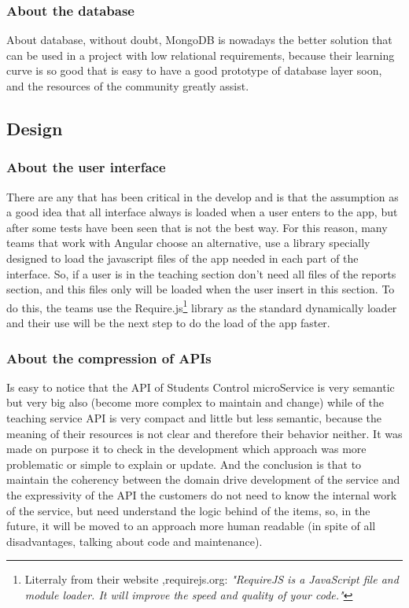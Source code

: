 \subsubsection{About the database}

About database, without doubt, MongoDB is nowadays the better solution that
can be used in a project with low relational requirements, because their learning
curve is so good that is easy to have a good prototype of database layer soon,
and the resources of the community greatly assist.

\subsection {Design}

\subsubsection{About the user interface}

There are any that has been critical in the develop and is that the assumption
as a good idea that all interface always is loaded when a user enters to the app,
but after some tests have been seen that is not the best way.  For this reason,
many teams that work with Angular choose an alternative, use a library specially
designed to load the javascript files of the app needed in each part of the interface.
\intro
So, if a user is in the teaching section don't need all files of the reports section, and this files only will be loaded when the user insert in this section. To do this,
the teams use the Require.js\footnote{Literraly from their website ,requirejs.org: \textit{"RequireJS is a
JavaScript file and module loader. It will improve the speed and quality of your code."}} library as
the standard dynamically loader and their use will be the next step to do the
load of the app faster.
\subsubsection{About the compression of APIs}

Is easy to notice that the API of Students Control microService is very semantic
but very big also (become more complex to maintain and change) while of the
teaching service API is very compact and little but less semantic, because the
meaning of their resources is not clear and therefore their behavior neither.
It was made on purpose it to check in the development which approach was more
problematic or simple to explain or update.
\intro
And the conclusion is that to maintain the coherency between the domain drive
development of the service and the expressivity of the API the customers do not
need to know the internal work of the service, but need understand the logic
behind of the items, so, in the future, it will be moved to an approach more human
readable (in spite of all disadvantages, talking about code and maintenance).

